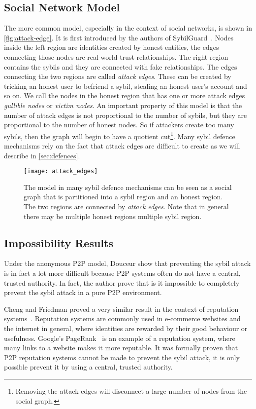 \subsection{Social Network Model}
The more common model, especially in the context of social networks, is shown in
\autoref{fig:attack-edge}. It is first introduced by the authors of
SybilGuard~\cite{yu2006sybilguard}. Nodes inside the left region are identities
created by honest entities, the edges connecting those nodes are real-world
trust relationships. The right region contains the sybils and they are connected
with fake relationships. The edges connecting the two regions are called
\emph{attack edges}. These can be created by tricking an honest user to befriend
a sybil, stealing an honest user's account and so on. We call the nodes in the
honest region that has one or more attack edges \emph{gullible nodes} or
\emph{victim nodes}. An important property of this model is that the number of
attack edges is not proportional to the number of sybils, but they are
proportional to the number of honest nodes. So if attackers create too many
sybils, then the graph will begin to have a quotient cut\footnote{Removing the
  attack edges will disconnect a large number of nodes from the social graph.}.
Many sybil defence mechanisms rely on the fact that attack edges are difficult
to create as we will describe in \autoref{sec:defences}.

\begin{figure}
  \centering
  \texttt{[image: attack\_edges]}
  \caption{The model in many sybil defence mechanisms can be seen as a social
    graph that is partitioned into a sybil region and an honest region. The two
    regions are connected by \emph{attack edges}. Note that in general there may
    be multiple honest regions multiple sybil region. }
  \label{fig:attack-edge}
\end{figure}

\subsection{Impossibility Results}\label{sec:sybil-theory}
Under the anonymous P2P model, Douceur show that preventing the sybil attack is
in fact a lot more difficult because P2P systems often do not have a central,
trusted authority. In fact, the author prove that is it impossible to completely
prevent the sybil attack in a pure P2P environment.

Cheng and Friedman proved a very similar result in the context of reputation
systems~\cite{cheng2005sybilproof}. Reputation systems are commonly used in
e-commerce websites and the internet in general, where identities are rewarded
by their good behaviour or usefulness. Google's PageRank~\cite{page1999pagerank}
is an example of a reputation system, where many links to a website makes it
more reputable. It was formally proven that P2P reputation systems cannot be
made to prevent the sybil attack, it is only possible prevent it by using a
central, trusted authority.

